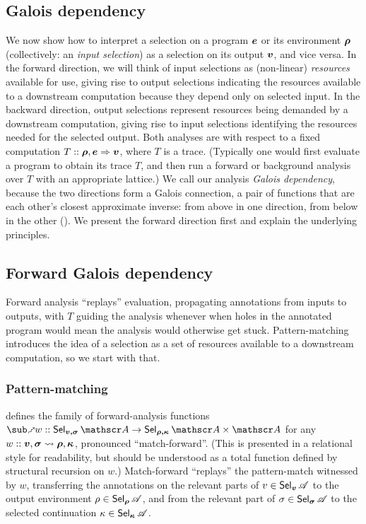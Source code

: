 \subsection{Galois dependency}
\label{sec:data-dependencies:analyses}

We now show how to interpret a selection on a program $\bm{e}$ or its environment $\bm{\rho}$ (collectively: an \emph{input selection}) as a selection on its output $\bm{v}$, and vice versa. In the forward direction, we will think of input selections as (non-linear) \emph{resources} available for use, giving rise to output selections indicating the resources available to a downstream computation because they depend only on selected input. In the backward direction, output selections represent resources being demanded by a downstream computation, giving rise to input selections identifying the resources needed for the selected output. Both analyses are with respect to a fixed computation $T :: \bm{\rho}, \bm{e} \Rightarrow \bm{v}$, where $T$ is a trace. (Typically one would first evaluate a program to obtain its trace $T$, and then run a forward or background analysis over $T$ with an appropriate lattice.) We call our analysis \emph{Galois dependency}, because the two directions form a Galois connection, a pair of functions that are each other's closest approximate inverse: from above in one direction, from below in the other ().  We present the forward direction first and explain the underlying principles.

\subsection{Forward Galois dependency}

Forward analysis ``replays'' evaluation, propagating annotations from inputs to outputs, with $T$ guiding the analysis whenever when holes in the annotated program would mean the analysis would otherwise get stuck. Pattern-matching introduces the idea of a selection as a set of resources available to a downstream computation, so we start with that.



\subsubsection{Pattern-matching}

 defines the family of forward-analysis functions $\matchFwdF{w} :: \Sel{v, \sigma}{A} \to \Prod{\Sel{\rho, \kappa}{A}}{\Ann{A}}$ for any $w :: \bm{v}, \bm{\sigma} \rightsquigarrow \bm{\rho}, \bm{\kappa}$, pronounced ``match-forward''. (This is presented in a relational style for readability, but should be understood as a total function defined by structural recursion on $w$.) Match-forward ``replays'' the pattern-match witnessed by $w$, transferring the annotations on the relevant parts of $v \in \textup{\textsf{Sel}}_{\bm{v}}\,{\mathscr{A}}$ to the output environment $\rho \in \textup{\textsf{Sel}}_{\bm{\rho}}\,{\mathscr{A}}$, and from the relevant part of $\sigma \in \textup{\textsf{Sel}}_{\bm{\sigma}}\,{\mathscr{A}}$ to the selected continuation $\kappa \in \textup{\textsf{Sel}}_{\bm{\kappa}}\,{\mathscr{A}}$.

